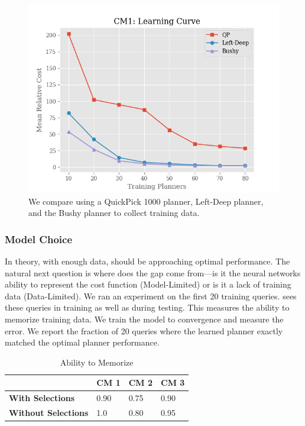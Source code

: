\begin{figure}
    \centering
    \includegraphics[width=0.8\columnwidth]{exp/exp2_plot3.png}
    \caption{ We compare using a QuickPick 1000 planner, Left-Deep planner, and the Bushy planner to collect training data.\label{exp:plot4}}
\end{figure}


\subsubsection{Model Choice}
In theory, with enough data, \sys should be approaching optimal performance.
The natural next question is where does the gap come from---is it the neural networks ability to represent the cost function (Model-Limited) or is it a lack of training data (Data-Limited).
We ran an experiment on the first 20 training queries. \sys sees these queries in training as well as during testing. This measures the ability to memorize training data. We train the model to convergence and measure the error. We report the fraction of 20 queries where the learned planner exactly matched the optimal planner performance.

\begin{table}[ht!]\centering \small
\caption{Ability to Memorize}\vspace{0.25em}
\begin{tabular}{|l|l|l|l|}\hline
    & {\bf CM 1}  & {\bf CM 2}  & {\bf CM 3} \\ \hline
{\bf With Selections}  & 0.90  & 0.75   & 0.90 \\ \hline
{\bf Without Selections}  & 1.0  & 0.80   &  0.95\\ \hline
\end{tabular}
\end{table}

